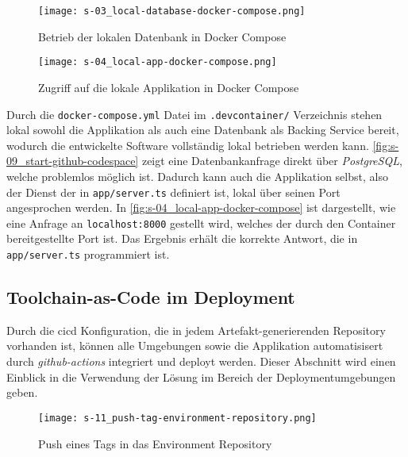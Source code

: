 \clearpage

\begin{figure}[H]
    \centering
    \texttt{[image: s-03\_local-database-docker-compose.png]}
    \caption{Betrieb der lokalen Datenbank in Docker Compose}
    \label{fig:s-03_local-database-docker-compose}
\end{figure}

\begin{figure}[H]
    \centering
    \texttt{[image: s-04\_local-app-docker-compose.png]}
    \caption{Zugriff auf die lokale Applikation in Docker Compose}
    \label{fig:s-04_local-app-docker-compose}
\end{figure}

Durch die \texttt{docker-compose.yml} Datei im \texttt{.devcontainer/} Verzeichnis stehen lokal sowohl die Applikation als auch eine Datenbank als Backing Service bereit, wodurch die entwickelte Software vollständig lokal betrieben werden kann. \autoref{fig:s-09_start-github-codespace} zeigt eine Datenbankanfrage direkt über \textit{PostgreSQL}, welche problemlos möglich ist. Dadurch kann auch die Applikation selbst, also der Dienst der in \texttt{app/server.ts} definiert ist, lokal über seinen Port angesprochen werden. In \autoref{fig:s-04_local-app-docker-compose} ist dargestellt, wie eine Anfrage an \texttt{localhost:8000} gestellt wird, welches der durch den Container bereitgestellte Port ist. Das Ergebnis erhält die korrekte Antwort, die in \texttt{app/server.ts} programmiert ist.

\subsection{Toolchain-as-Code im Deployment}
\label{subsec:06-03-02_toolchain-as-code-in-deployment}

Durch die \Gls{cicd} Konfiguration, die in jedem Artefakt-generierenden Repository vorhanden ist, können alle Umgebungen sowie die Applikation automatisisert durch \textit{\Gls{github-actions}} integriert und deployt werden. Dieser Abschnitt wird einen Einblick in die Verwendung der  Lösung im Bereich der Deploymentumgebungen geben.

\begin{wrapfigure}{l}{0.4\textwidth}
    \vspace{-10pt}
    \centering
    \texttt{[image: s-11\_push-tag-environment-repository.png]}
    \caption{Push eines Tags in das Environment Repository}
    \label{fig:s-11_push-tag-environment-repository}
    \vspace{-05pt}
\end{wrapfigure}

